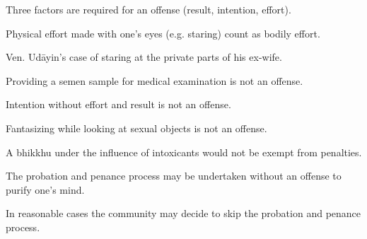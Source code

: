 \begin{exam}{\autoExamName}
\begin{problem*}
\begin{parts}
    \bigskip

    \item {} Three factors are required for an offense (result, intention, effort).

    \bigskip

    \item {} Physical effort made with one's eyes (e.g. staring) count as bodily effort.

    \begin{solution}
      Ven. Udāyin's case of staring at the private parts of his ex-wife.
    \end{solution}

    \bigskip

    \item {} Providing a semen sample for medical examination is not an offense.

    \bigskip

    \item {} Intention without effort and result is not an offense.

    \bigskip

    \item {} Fantasizing while looking at sexual objects is not an offense.

    \bigskip

    \item {} A bhikkhu under the influence of intoxicants would not be exempt from penalties.

    \bigskip

    \item {} The probation and penance process may be undertaken without an offense to purify one's mind.

    \bigskip

    \item {} In reasonable cases the community may decide to skip the probation and penance process.

  \end{parts}

\end{problem*}

\end{exam}
